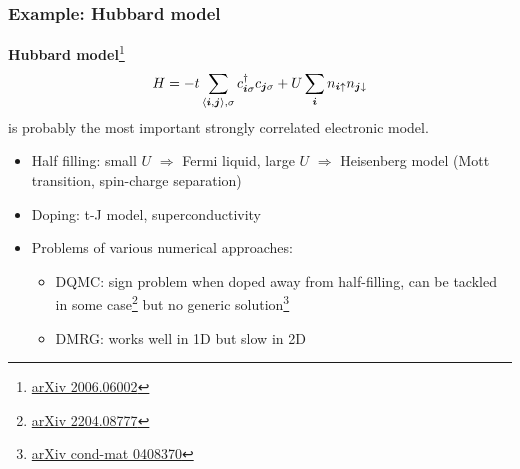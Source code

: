 \documentclass{beamer}
\newcommand{\pair}[1]{\langle #1 \rangle}
\newcommand{\concept}[1]{\textbf{#1}}
\begin{document}
\begin{frame}
\frametitle{Example: Hubbard model}

\concept{Hubbard model}\footnote{\href{https://arxiv.org/abs/2006.06002}{arXiv 2006.06002}}
\begin{equation}
    H = - t \sum_{\pair{\vb*{i}, \vb*{j}}, \sigma} c^\dagger_{\vb*{i} \sigma} c_{\vb*{j} \sigma} + U \sum_{\vb*{i}} n_{\vb*{i} \uparrow} n_{\vb*{j} \downarrow}
\end{equation}
is probably the most important strongly correlated electronic model.

\begin{itemize}
    \item Half filling: small $U$ $\Rightarrow$ Fermi liquid, large $U$ $\Rightarrow$ Heisenberg model (Mott transition, spin-charge separation)
    \item Doping: t-J model, superconductivity
    \item Problems of various numerical approaches:
    \begin{itemize}
        \item DQMC: sign problem when doped away from half-filling, can be tackled in some case\footnote{\href{https://arxiv.org/abs/2204.08777}{arXiv 2204.08777}} but no generic solution\footnote{\href{https://arxiv.org/abs/cond-mat/0408370}{arXiv cond-mat 0408370}} 
        \item DMRG: works well in 1D but slow in 2D 
    \end{itemize}
\end{itemize}

\end{frame}
\end{document}
